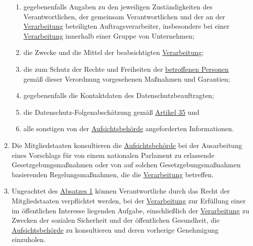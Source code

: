 \begin{enumerate}
\begin{enumerate}
    \item gegebenenfalls Angaben zu den jeweiligen Zuständigkeiten des Verantwortlichen, der gemeinsam Verantwortlichen
     und der an der \hyperref[itm:04-2]{Verarbeitung} beteiligten Auftragsverarbeiter, insbesondere bei einer \hyperref[itm:04-2]{Verarbeitung} innerhalb einer
     Gruppe von Unternehmen;
    \label{itm:36-3a}

    \item die Zwecke und die Mittel der beabsichtigten \hyperref[itm:04-2]{Verarbeitung};
    \label{itm:36-3b}

    \item die zum Schutz der Rechte und Freiheiten der \hyperref[itm:04-1]{betroffenen Personen} gemäß dieser Verordnung vorgesehenen
     Maßnahmen und Garantien;
    \label{itm:36-3c}

    \item gegebenenfalls die Kontaktdaten des Datenschutzbeauftragten;
    \label{itm:36-3d}

    \item die Datenschutz-Folgenabschätzung gemäß \hyperref[ch:35]{Artikel 35} und
    \label{itm:36-3e}

    \item alle sonstigen von der \hyperref[itm:04-21]{Aufsichtsbehörde} angeforderten Informationen.
    \label{itm:36-3f}

  \end{enumerate}

  \item Die Mitgliedstaaten konsultieren die \hyperref[itm:04-21]{Aufsichtsbehörde} bei der Ausarbeitung eines Vorschlags für von einem
   nationalen Parlament zu erlassende Gesetzgebungsmaßnahmen oder von auf solchen Gesetzgebungsmaßnahmen basierenden
   Regelungsmaßnahmen, die die \hyperref[itm:04-2]{Verarbeitung} betreffen.
  \label{itm:36-4}

  \item Ungeachtet des \hyperref[itm:36-1]{Absatzes 1} können Verantwortliche durch das Recht der Mitgliedstaaten
   verpflichtet werden, bei der \hyperref[itm:04-2]{Verarbeitung} zur Erfüllung einer im öffentlichen Interesse liegenden Aufgabe,
   einschließlich der \hyperref[itm:04-2]{Verarbeitung} zu Zwecken der sozialen Sicherheit und der öffentlichen Gesundheit, die
   \hyperref[itm:04-21]{Aufsichtsbehörde} zu konsultieren und deren vorherige Genehmigung einzuholen.
  \label{itm:36-5}
   
\end{enumerate}


